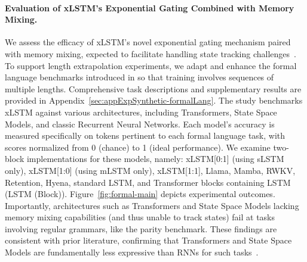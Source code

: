 \paragraph{Evaluation of xLSTM’s Exponential Gating Combined with Memory Mixing.} We assess the efficacy of xLSTM’s novel exponential gating mechanism paired with memory mixing, expected to facilitate handling state tracking challenges~\citep{Merrill:24, Merrill:23}. To support length extrapolation experiments, we adapt and enhance the formal language benchmarks introduced in \citet{Deletang:23} so that training involves sequences of multiple lengths. Comprehensive task descriptions and supplementary results are provided in Appendix~\ref{sec:appExpSynthetic-formalLang}. The study benchmarks xLSTM against various architectures, including Transformers, State Space Models, and classic Recurrent Neural Networks. Each model’s accuracy is measured specifically on tokens pertinent to each formal language task, with scores normalized from 0 (chance) to 1 (ideal performance). We examine two-block implementations for these models, namely: xLSTM[0:1] (using sLSTM only), xLSTM[1:0] (using mLSTM only), xLSTM[1:1], Llama, Mamba, RWKV, Retention, Hyena, standard LSTM, and Transformer blocks containing LSTM (LSTM (Block)). Figure~\ref{fig:formal-main} depicts experimental outcomes. Importantly, architectures such as Transformers and State Space Models lacking memory mixing capabilities (and thus unable to track states) fail at tasks involving regular grammars, like the parity benchmark. These findings are consistent with prior literature, confirming that Transformers and State Space Models are fundamentally less expressive than RNNs for such tasks~\citep{Merrill:24, Merrill:23, Deletang:23}.

